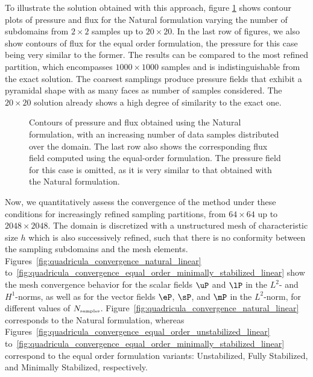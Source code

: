 To illustrate the solution obtained with this approach, figure \ref{fig:compound_Nsamples} shows
contour plots of pressure and flux for the Natural formulation 
varying the number of subdomains from $2\times 2$ samples up to $20 \times 20$. 
In the last row of figures, we also show contours of flux for the equal order
formulation, the pressure for this case being very similar to the former. 
The results can be compared to the most refined partition, which encompasses $1000 \times 1000$
samples and is indistinguishable from the exact solution. 
The coarsest samplings produce pressure fields that exhibit a pyramidal shape with
as many faces as number of samples considered. The $20 \times 20$ solution 
already shows a high degree of similarity to the exact one.
\begin{figure}[h!]
	\centering
	\caption{Contours of pressure and flux obtained using the Natural formulation, with an increasing number of data samples distributed over the domain. The last row also shows the corresponding flux field computed using the equal-order formulation. The pressure field for this case is omitted, as it is very
	similar to that obtained with the Natural formulation.}
	\fontsize{8pt}{10pt}\selectfont 
	\def\svgwidth{1.0\columnwidth}
	
	\label{fig:compound_Nsamples}
\end{figure}

Now, we quantitatively assess the convergence of the method under these conditions for
increasingly refined sampling partitions, from $64 \times 64$ up to $2048 \times 2048$.
The domain is discretized with a unstructured mesh of characteristic size $h$ which
is also successively refined, such that there is no conformity between the sampling
subdomains and the mesh elements. Figures~\ref{fig:quadricula_convergence_natural_linear} to~\ref{fig:quadricula_convergence_equal_order_minimally_stabilized_linear} show the mesh convergence behavior for the scalar fields $\uP$ and $\lP$ in the $L^{2}$- and $H^{1}$-norms, as well as for the vector fields $\eP$, $\sP$, and $\mP$ in the $L^{2}$-norm, for different values of $N_{\mbox{\tiny samples}}$. Figure~\ref{fig:quadricula_convergence_natural_linear} corresponds to the Natural formulation, whereas Figures~\ref{fig:quadricula_convergence_equal_order_unstabilized_linear} to~\ref{fig:quadricula_convergence_equal_order_minimally_stabilized_linear} correspond to the equal order formulation variants: Unstabilized, Fully Stabilized, and Minimally Stabilized, respectively.

